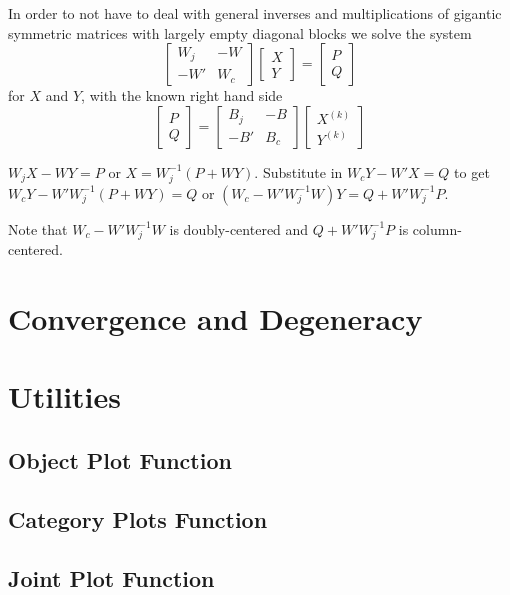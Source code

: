 \documentclass[
  12pt,
]{article}
\begin{document}
In order to not have to deal with general inverses and multiplications of gigantic symmetric matrices with largely empty diagonal blocks we solve the system
\[
\begin{bmatrix}
W_j&-W\\
-W'&W_c
\end{bmatrix}
\begin{bmatrix}
X\\Y
\end{bmatrix}
=
\begin{bmatrix}
P\\Q
\end{bmatrix}
\]
for \(X\) and \(Y\), with the known right hand side
\[
\begin{bmatrix}P\\Q\end{bmatrix}=
\begin{bmatrix}
B_j&-B\\
-B'&B_c
\end{bmatrix}
\begin{bmatrix}
X^{(k)}\\Y^{(k)}
\end{bmatrix}
\]

\(W_jX-WY=P\) or \(X=W_j^{-1}(P+WY)\). Substitute in \(W_cY-W'X=Q\)
to get \(W_cY-W'W_j^{-1}(P+WY)=Q\) or \((W_c-W'W_j^{-1}W)Y=Q+W'W_j^{-1}P\).

Note that \(W_c-W'W_j^{-1}W\) is doubly-centered and \(Q+W'W_j^{-1}P\) is column-centered.

\section{Convergence and Degeneracy}\label{convergence-and-degeneracy}

\section{Utilities}\label{utilities}

\subsection{Object Plot Function}\label{object-plot-function}

\subsection{Category Plots Function}\label{category-plots-function}

\subsection{Joint Plot Function}\label{joint-plot-function}
\end{document}
